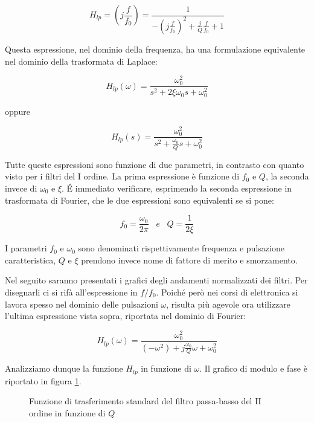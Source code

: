 \documentclass[../main.tex]{subfiles}
\begin{document}
\begin{equation}
	H_{lp} = \left( j \frac{f}{f_0} \right) = \frac{1}{- \left( j \frac{f}{f_0} \right)^2 + \frac{j}{Q} \frac{f}{f_0} + 1}
\end{equation}

Questa espressione, nel dominio della frequenza, ha una formulazione equivalente nel dominio della trasformata di Laplace:

\begin{equation}
	H_{lp}(\omega) = \frac{\omega_0^2}{s^2 + 2 \xi \omega_0 s + \omega_0^2}
\end{equation}

oppure

\begin{equation}
	H_{lp}(s) = \frac{\omega_0^2}{s^2 + \frac{\omega_0 }{Q} s + \omega_0^2}
\end{equation}

Tutte queste espressioni sono funzione di due parametri, in contrasto con quanto visto per i filtri del I ordine. La prima espressione è funzione di $f_0$ e $Q$, la seconda invece di $\omega_0$ e $\xi$. É immediato verificare, esprimendo la seconda espressione in trasformata di Fourier, che le due espressioni sono equivalenti se si pone:

\begin{equation}
	f_0 = \frac{\omega_0}{2\pi} \;\;\; \unit{e} \;\;\; Q = \frac{1}{2\xi}
\end{equation}

I parametri $f_0$ e $\omega_0$ sono denominati rispettivamente frequenza e pulsazione caratteristica, $Q$ e $\xi$ prendono invece nome di fattore di merito e smorzamento.

Nel seguito saranno presentati i grafici degli andamenti normalizzati dei filtri.
Per disegnarli ci si rifà all’espressione in $f/f_0$. Poiché però nei corsi di elettronica si lavora spesso nel dominio delle pulsazioni $\omega$, risulta più agevole ora utilizzare l’ultima espressione vista sopra, riportata nel dominio di Fourier:

\begin{equation}
	H_{lp} (\omega) = \frac{\omega_0^2}{(-\omega^2) + j \frac{\omega_0}{Q} \omega + \omega_0^2}
\end{equation}

Analizziamo dunque la funzione $H_{lp}$ in funzione di $\omega$. Il grafico di modulo e fase è riportato in figura \ref{filtri14}.

\begin{figure}
\begin{center}


\label{filtri14}
\caption{Funzione di trasferimento standard del filtro passa-basso del II ordine in funzione di $Q$}	
\end{center}	
\end{figure}
\end{document}
